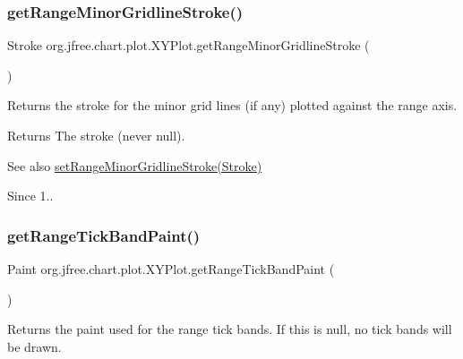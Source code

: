 \subsubsection{\texorpdfstring{get\+Range\+Minor\+Gridline\+Stroke()}{getRangeMinorGridlineStroke()}}
{\footnotesize\ttfamily Stroke org.\+jfree.\+chart.\+plot.\+X\+Y\+Plot.\+get\+Range\+Minor\+Gridline\+Stroke (\begin{DoxyParamCaption}{ }\end{DoxyParamCaption})}

Returns the stroke for the minor grid lines (if any) plotted against the range axis.

\begin{DoxyReturn}{Returns}
The stroke (never {\ttfamily null}).
\end{DoxyReturn}
\begin{DoxySeeAlso}{See also}
\mbox{\hyperlink{classorg_1_1jfree_1_1chart_1_1plot_1_1_x_y_plot_ad75d87153b88ec024020f24ee1c683ef}{set\+Range\+Minor\+Gridline\+Stroke(\+Stroke)}}
\end{DoxySeeAlso}
\begin{DoxySince}{Since}
1.. 
\end{DoxySince}
\mbox{\label{classorg_1_1jfree_1_1chart_1_1plot_1_1_x_y_plot_a38f62f0996960915c78769ff45e6b848}} 
\subsubsection{\texorpdfstring{get\+Range\+Tick\+Band\+Paint()}{getRangeTickBandPaint()}}
{\footnotesize\ttfamily Paint org.\+jfree.\+chart.\+plot.\+X\+Y\+Plot.\+get\+Range\+Tick\+Band\+Paint (\begin{DoxyParamCaption}{ }\end{DoxyParamCaption})}

Returns the paint used for the range tick bands. If this is {\ttfamily null}, no tick bands will be drawn.

